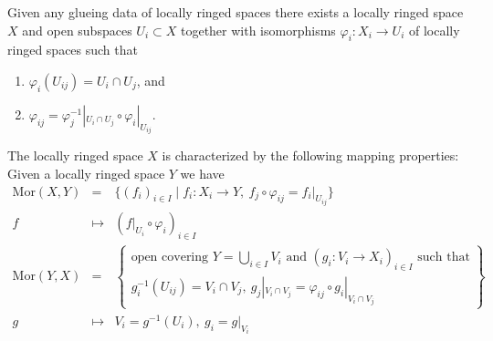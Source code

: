 \begin{lemma}
\label{lemma-glue}
Given any glueing data of locally ringed spaces there
exists a locally ringed space $X$ and open subspaces
$U_i \subset X$ together with isomorphisms
$\varphi_i : X_i \to U_i$ of locally ringed spaces such that
\begin{enumerate}
\item $\varphi_i(U_{ij}) = U_i \cap U_j$, and
\item $\varphi_{ij} =
\varphi_j^{-1}|_{U_i \cap U_j} \circ \varphi_i|_{U_{ij}}$.
\end{enumerate}
The locally ringed space $X$ is characterized by the following
mapping properties: Given a locally ringed space $Y$ we have
\begin{eqnarray*}
\text{Mor}(X, Y) & = & \{ (f_i)_{i\in I} \mid
f_i : X_i \to Y,\ f_j \circ \varphi_{ij} = f_i|_{U_{ij}}\} \\
f & \mapsto & (f|_{U_i} \circ \varphi_i)_{i \in I} \\
\text{Mor}(Y, X) & = &
\left\{
\begin{matrix}
\text{open covering }Y = \bigcup\nolimits_{i \in I} V_i\text{ and }
(g_i : V_i \to X_i)_{i \in I}
\text{ such that}\\
g_i^{-1}(U_{ij}) = V_i \cap V_j,\ 
g_j|_{V_i \cap V_j} = \varphi_{ij} \circ g_i|_{V_i \cap V_j}
\end{matrix}
\right\} \\
g & \mapsto &
V_i = g^{-1}(U_i),\ g_i = g|_{V_i}
\end{eqnarray*}
\end{lemma}

